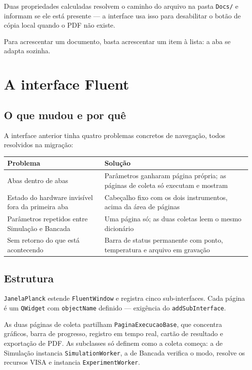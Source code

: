 \documentclass[11pt,a4paper]{article}
\newcommand{\classe}[1]{\texttt{#1}}
\begin{document}
Duas propriedades calculadas resolvem o caminho do arquivo na pasta
\texttt{Docs/} e informam se ele está presente --- a interface usa isso para
desabilitar o botão de cópia local quando o PDF não existe.

Para acrescentar um documento, basta acrescentar um item à lista: a aba se
adapta sozinha.

\section{A interface Fluent}
\label{sec:fluent}

\subsection{O que mudou e por quê}

A interface anterior tinha quatro problemas concretos de navegação, todos
resolvidos na migração:

\begin{center}
\begin{tabular}{@{}p{6.4cm}p{8.2cm}@{}}
\toprule
\textbf{Problema} & \textbf{Solução} \\
\midrule
Abas dentro de abas &
Parâmetros ganharam página própria; as páginas de coleta só executam e mostram \\[0.4em]
Estado do hardware invisível fora da primeira aba &
Cabeçalho fixo com os dois instrumentos, acima da área de páginas \\[0.4em]
Parâmetros repetidos entre Simulação e Bancada &
Uma página só; as duas coletas leem o mesmo dicionário \\[0.4em]
Sem retorno do que está acontecendo &
Barra de status permanente com ponto, temperatura e arquivo em gravação \\
\bottomrule
\end{tabular}
\end{center}

\subsection{Estrutura}

\classe{JanelaPlanck} estende \classe{FluentWindow} e registra cinco
sub-interfaces. Cada página é um \classe{QWidget} com \texttt{objectName}
definido --- exigência do \texttt{addSubInterface}.

As duas páginas de coleta partilham \classe{PaginaExecucaoBase}, que concentra
gráficos, barra de progresso, registro em tempo real, cartão de resultado e
exportação de PDF. As subclasses só definem como a coleta começa: a de
Simulação instancia \classe{SimulationWorker}, a de Bancada verifica o modo,
resolve os recursos VISA e instancia \classe{ExperimentWorker}.
\end{document}
